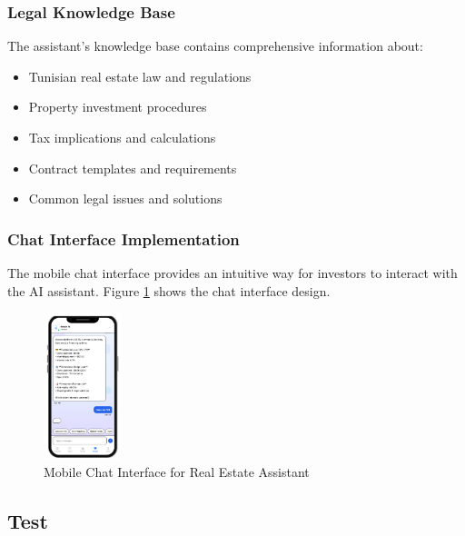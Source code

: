 \subsubsection{Legal Knowledge Base}
The assistant's knowledge base contains comprehensive information about:
\begin{itemize}
    \item Tunisian real estate law and regulations
    \item Property investment procedures
    \item Tax implications and calculations
    \item Contract templates and requirements
    \item Common legal issues and solutions
\end{itemize}

\subsubsection{Chat Interface Implementation}
The mobile chat interface provides an intuitive way for investors to interact with the AI assistant. Figure \ref{fig:assistant-mobile-chat} shows the chat interface design.
\begin{figure}[htbp]
    \centering
    \includegraphics[width=0.2\textwidth]{images/assistant_mobile_chat.png}
    \caption{Mobile Chat Interface for Real Estate Assistant}
    \label{fig:assistant-mobile-chat}
\end{figure}


\subsection{Test}
